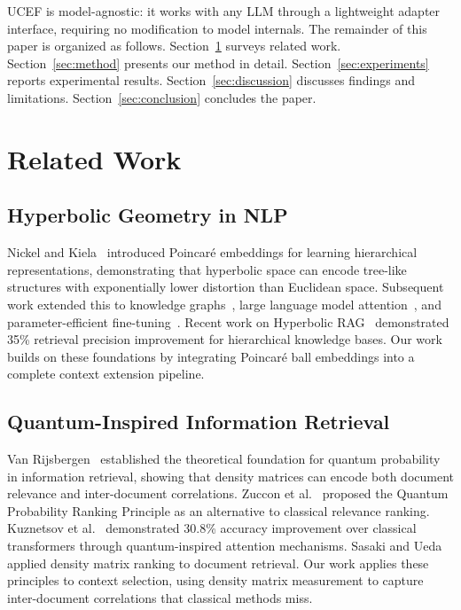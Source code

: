 \documentclass[journal]{IEEEtran}
\newcommand{\ucef}{\textsf{UCEF}}
\begin{document}
\noindent \ucef{} is model-agnostic: it works with any LLM through a lightweight
adapter interface, requiring no modification to model internals.
The remainder of this paper is organized as follows.
Section~\ref{sec:related} surveys related work.
Section~\ref{sec:method} presents our method in detail.
Section~\ref{sec:experiments} reports experimental results.
Section~\ref{sec:discussion} discusses findings and limitations.
Section~\ref{sec:conclusion} concludes the paper.


\section{Related Work}
\label{sec:related}

\subsection{Hyperbolic Geometry in NLP}

Nickel and Kiela~\cite{nickel2017poincare} introduced Poincar\'{e}
embeddings for learning hierarchical representations, demonstrating that
hyperbolic space can encode tree-like structures with exponentially lower
distortion than Euclidean space.  Subsequent work extended this to knowledge
graphs~\cite{sun2024lorentz}, large language model
attention~\cite{patil2025hyperbolicllm}, and parameter-efficient
fine-tuning~\cite{bronstein2024hyplora}.  Recent work on Hyperbolic
RAG~\cite{chen2025hyperbolicrag} demonstrated 35\% retrieval precision
improvement for hierarchical knowledge bases.  Our work builds on these
foundations by integrating Poincar\'{e} ball embeddings into a complete
context extension pipeline.

\subsection{Quantum-Inspired Information Retrieval}

Van Rijsbergen~\cite{vanrijsbergen2004} established the theoretical
foundation for quantum probability in information retrieval, showing that
density matrices can encode both document relevance and inter-document
correlations.  Zuccon et al.~\cite{zuccon2009} proposed the Quantum
Probability Ranking Principle as an alternative to classical relevance
ranking.  Kuznetsov et al.~\cite{kuznetsov2026qisa} demonstrated 30.8\%
accuracy improvement over classical transformers through quantum-inspired
attention mechanisms.  Sasaki and Ueda~\cite{sasaki2023quantumctx} applied
density matrix ranking to document retrieval.  Our work applies these
principles to context selection, using density matrix measurement to
capture inter-document correlations that classical methods miss.
\end{document}

